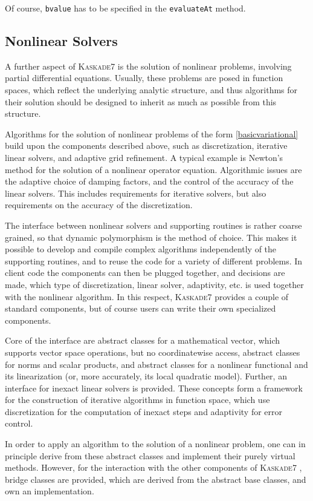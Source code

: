 \documentclass[11pt]{article}
\newcommand{\K}{\textsc{Kaskade7 }}
\begin{document}
\noindent Of course, {\tt bvalue} has to be specified in the {\tt evaluateAt} method.


\subsection{Nonlinear Solvers} 

A further aspect of \K is the solution of nonlinear problems, involving partial differential
equations. Usually, these problems are posed in function spaces, which reflect the underlying analytic structure, 
and thus algorithms for their solution should be designed to inherit as much as possible from this structure. 

Algorithms for the solution of nonlinear problems of the form \eqref{basicvariational} build upon the
components described above, such as discretization, iterative linear solvers, and adaptive grid refinement.
A typical example is Newton's method for the solution of a nonlinear operator equation. Algorithmic 
issues are the adaptive choice of damping factors, and the control of the accuracy of the linear solvers.
This includes requirements for iterative solvers, but also requirements on the
accuracy of the discretization. 

The interface between nonlinear solvers and supporting routines is rather coarse grained, so that dynamic
polymorphism is the method of choice. This makes it possible to develop and compile complex algorithms
independently of the supporting routines, and to reuse the code for a variety of different problems. In client 
code the components can then be plugged together, and decisions are made, which type of discretization, 
linear solver, adaptivity, etc. is used together with the nonlinear algorithm. In this respect, \K 
provides a couple of standard components, but of course users can write their own specialized components. 

Core of the interface are abstract classes for a mathematical vector, which supports vector
space operations, but no coordinatewise access, abstract classes for norms and scalar
products, and abstract classes for a nonlinear functional and its linearization (or, more accurately, its local 
quadratic model). Further, an interface for inexact linear solvers is provided. These concepts form a framework 
for the construction of iterative algorithms in function space, which use discretization for the computation of 
inexact steps and adaptivity for error control.

In order to apply an algorithm to the solution of a nonlinear problem, one can in principle derive from these 
abstract classes and implement their purely virtual methods. However, for the interaction with the other 
components of \K, bridge classes are provided, which are derived from the abstract base classes,
and own an implementation.
\end{document}
